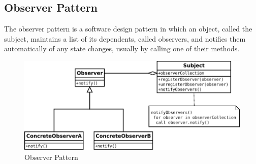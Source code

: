 \documentclass[a4paper, 12pt]{article}
\begin{document}
	\subsection{Observer Pattern}
	
The observer pattern is a software design pattern in which an object, called the subject, maintains a list of its dependents, called observers, and notifies them automatically of any state changes, usually by calling one of their methods.

\begin{figure}[!h]
	\center\includegraphics[width=12cm]{figures/observer.png}
	\caption{Observer Pattern}
\end{figure}
\end{document}
